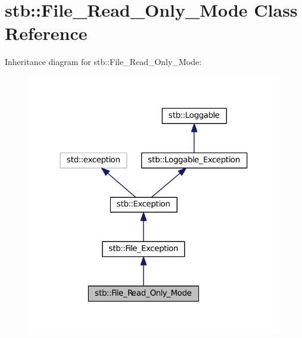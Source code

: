 \hypertarget{classstb_1_1File__Read__Only__Mode}{\section{stb\+:\+:File\+\_\+\+Read\+\_\+\+Only\+\_\+\+Mode Class Reference}
\label{classstb_1_1File__Read__Only__Mode}
}


Inheritance diagram for stb\+:\+:File\+\_\+\+Read\+\_\+\+Only\+\_\+\+Mode\+:
\nopagebreak
\begin{figure}[H]
\begin{center}
\leavevmode
\includegraphics[width=316pt]{classstb_1_1File__Read__Only__Mode__inherit__graph}
\end{center}
\end{figure}


